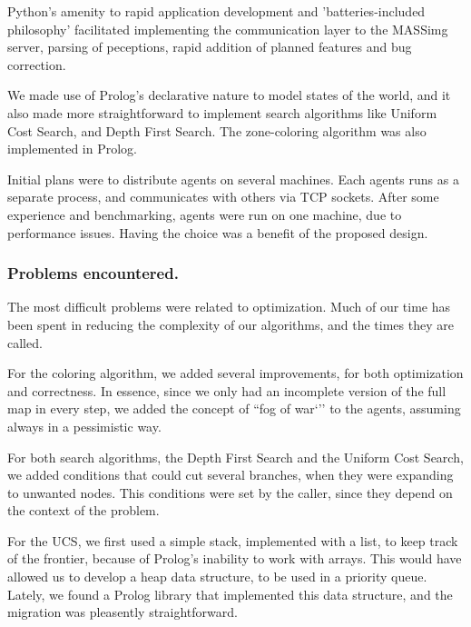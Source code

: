 \documentclass{llncs2e/llncs}
\begin{document}
    Python's amenity to rapid application development and 'batteries-included 
    philosophy' facilitated implementing the communication layer to the MASSimg 
    server, parsing of peceptions, rapid addition of planned features and bug 
    correction.

    We made use of Prolog's declarative nature to model states of the world, and it 
    also made more straightforward to implement search algorithms like Uniform Cost 
    Search, and Depth First Search. The zone-coloring algorithm was also 
    implemented in Prolog.
    

    Initial plans were to distribute agents on several machines. Each agents runs 
    as a separate process, and communicates with others via TCP sockets. After 
    some experience and benchmarking, agents were run on one machine, due to 
    performance issues. 
    Having the choice was a benefit of the proposed design.

\subsubsection{Problems encountered.}

    The most difficult problems were related to optimization. Much of our time has 
    been spent in reducing the complexity of our algorithms, and the times they 
    are called.

    For the coloring algorithm, we added several improvements, for both 
    optimization and correctness. In essence, since we only had an incomplete 
    version of the full map in every step, we added the concept of ``fog of war`'' 
    to the agents, assuming always in a pessimistic way. 

    For both search algorithms, the Depth First Search and the Uniform Cost 
    Search, we added conditions that could cut several branches, when they were 
    expanding to unwanted nodes. This conditions were set by the caller, since 
    they depend on the context of the problem.

    For the UCS, we first used a simple stack, implemented with a list, to keep 
    track of the frontier, because of Prolog's inability to work with arrays. This 
    would have allowed us to develop a heap data structure, to be used in a 
    priority queue. Lately, we found a Prolog library that implemented this data 
    structure, and the migration was pleasently straightforward.
\end{document}
